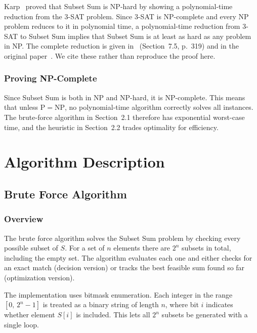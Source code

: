 \documentclass[12pt,a4paper]{article}
\theoremstyle{definition}
\begin{document}
Karp~\cite{karp} proved that Subset Sum is NP-hard by showing a polynomial-time
reduction from the 3-SAT problem. Since 3-SAT is NP-complete and every
NP problem reduces to it in polynomial time, a polynomial-time reduction from
3-SAT to Subset Sum implies that Subset Sum is at least as hard as any
problem in NP. The complete reduction is given in~\cite{sipser} (Section~7.5,
p.~319) and in the original paper~\cite{karp}. We cite these rather than
reproduce the proof here.

\subsubsection{Proving NP-Complete}

Since Subset Sum is both in NP and NP-hard, it is NP-complete. This means
that unless $\mathrm{P} = \mathrm{NP}$, no polynomial-time algorithm correctly
solves all instances. The brute-force algorithm in Section~2.1 therefore has
exponential worst-case time, and the heuristic in Section~2.2 trades optimality
for efficiency.


\section{Algorithm Description}

\subsection{Brute Force Algorithm}

\subsubsection{Overview}

The brute force algorithm solves the Subset Sum problem by checking every
possible subset of $S$. For a set of $n$ elements there are $2^n$ subsets in
total, including the empty set. The algorithm evaluates each one and either
checks for an exact match (decision version) or tracks the best feasible sum
found so far (optimization version).

The implementation uses bitmask enumeration. Each integer in the range
$[0,\, 2^n - 1]$ is treated as a binary string of length $n$, where bit $i$
indicates whether element $S[i]$ is included. This lets all $2^n$ subsets be
generated with a single loop.
\end{document}
